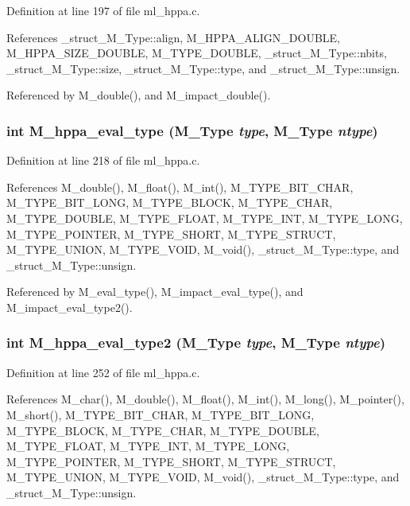 Definition at line 197 of file ml\_\-hppa.c.

References \_\-struct\_\-M\_\-Type::align, M\_\-HPPA\_\-ALIGN\_\-DOUBLE, M\_\-HPPA\_\-SIZE\_\-DOUBLE, M\_\-TYPE\_\-DOUBLE, \_\-struct\_\-M\_\-Type::nbits, \_\-struct\_\-M\_\-Type::size, \_\-struct\_\-M\_\-Type::type, and \_\-struct\_\-M\_\-Type::unsign.

Referenced by M\_\-double(), and M\_\-impact\_\-double().
\subsubsection{\setlength{\rightskip}{0pt plus 5cm}int M\_\-hppa\_\-eval\_\-type (\bf{M\_\-Type} {\em type}, \bf{M\_\-Type} {\em ntype})}\label{ml__hppa_8c_888352af2b57db93f3b85cf7f4e0465e}




Definition at line 218 of file ml\_\-hppa.c.

References M\_\-double(), M\_\-float(), M\_\-int(), M\_\-TYPE\_\-BIT\_\-CHAR, M\_\-TYPE\_\-BIT\_\-LONG, M\_\-TYPE\_\-BLOCK, M\_\-TYPE\_\-CHAR, M\_\-TYPE\_\-DOUBLE, M\_\-TYPE\_\-FLOAT, M\_\-TYPE\_\-INT, M\_\-TYPE\_\-LONG, M\_\-TYPE\_\-POINTER, M\_\-TYPE\_\-SHORT, M\_\-TYPE\_\-STRUCT, M\_\-TYPE\_\-UNION, M\_\-TYPE\_\-VOID, M\_\-void(), \_\-struct\_\-M\_\-Type::type, and \_\-struct\_\-M\_\-Type::unsign.

Referenced by M\_\-eval\_\-type(), M\_\-impact\_\-eval\_\-type(), and M\_\-impact\_\-eval\_\-type2().
\subsubsection{\setlength{\rightskip}{0pt plus 5cm}int M\_\-hppa\_\-eval\_\-type2 (\bf{M\_\-Type} {\em type}, \bf{M\_\-Type} {\em ntype})}\label{ml__hppa_8c_9f1775696fc5518a268eb6fd815cb6fe}




Definition at line 252 of file ml\_\-hppa.c.

References M\_\-char(), M\_\-double(), M\_\-float(), M\_\-int(), M\_\-long(), M\_\-pointer(), M\_\-short(), M\_\-TYPE\_\-BIT\_\-CHAR, M\_\-TYPE\_\-BIT\_\-LONG, M\_\-TYPE\_\-BLOCK, M\_\-TYPE\_\-CHAR, M\_\-TYPE\_\-DOUBLE, M\_\-TYPE\_\-FLOAT, M\_\-TYPE\_\-INT, M\_\-TYPE\_\-LONG, M\_\-TYPE\_\-POINTER, M\_\-TYPE\_\-SHORT, M\_\-TYPE\_\-STRUCT, M\_\-TYPE\_\-UNION, M\_\-TYPE\_\-VOID, M\_\-void(), \_\-struct\_\-M\_\-Type::type, and \_\-struct\_\-M\_\-Type::unsign.

